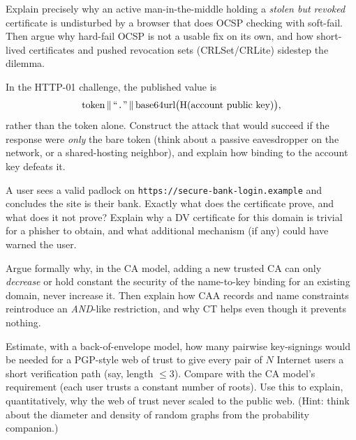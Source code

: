 \begin{exercise}
Explain precisely why an active man-in-the-middle holding a \emph{stolen but revoked} certificate is undisturbed by a browser that does OCSP checking with soft-fail. Then argue why hard-fail OCSP is not a usable fix on its own, and how short-lived certificates and pushed revocation sets (CRLSet/CRLite) sidestep the dilemma.
\end{exercise}

\begin{exercise}
In the HTTP-01 challenge, the published value is
\[
\text{token} \,\|\, \text{``\texttt{.}''} \,\|\, \text{base64url}\bigl(\operatorname{H}(\text{account public key})\bigr),
\]
rather than the token alone. Construct the attack that would succeed if the response were \emph{only} the bare token (think about a passive eavesdropper on the network, or a shared-hosting neighbor), and explain how binding to the account key defeats it.
\end{exercise}

\begin{exercise}
A user sees a valid padlock on \texttt{https://\allowbreak secure-\allowbreak bank-\allowbreak login.\allowbreak example} and concludes the site is their bank. Exactly what does the certificate prove, and what does it not prove? Explain why a DV certificate for this domain is trivial for a phisher to obtain, and what additional mechanism (if any) could have warned the user.
\end{exercise}

\begin{exercise}[Trust is an OR]
Argue formally why, in the CA model, adding a new trusted CA can only \emph{decrease} or hold constant the security of the name-to-key binding for an existing domain, never increase it. Then explain how CAA records and name constraints reintroduce an \emph{AND}-like restriction, and why CT helps even though it prevents nothing.
\end{exercise}

\begin{exercise}
Estimate, with a back-of-envelope model, how many pairwise key-signings would be needed for a PGP-style web of trust to give every pair of $N$ Internet users a short verification path (say, length $\le 3$). Compare with the CA model's requirement (each user trusts a constant number of roots). Use this to explain, quantitatively, why the web of trust never scaled to the public web. (Hint: think about the diameter and density of random graphs from the probability companion.)
\end{exercise}
